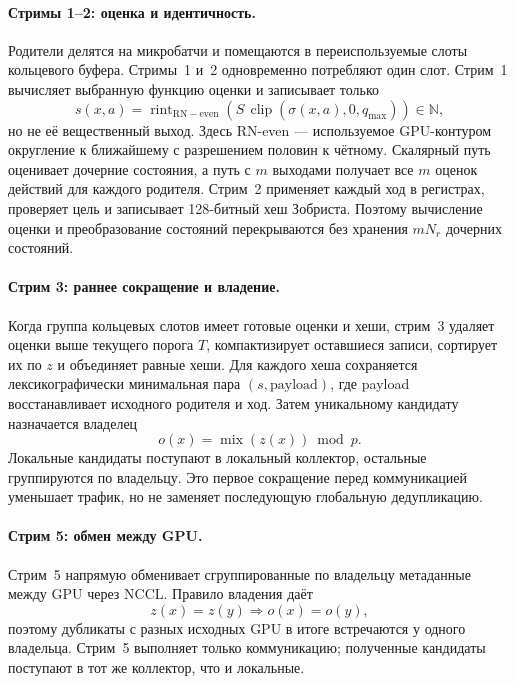 \documentclass[10pt,twocolumn]{article}
\begin{document}
\paragraph{Стримы 1--2: оценка и идентичность.}
Родители делятся на микробатчи и помещаются в переиспользуемые слоты кольцевого
буфера. Стримы~1 и~2 одновременно потребляют один слот. Стрим~1 вычисляет
выбранную функцию оценки и записывает только
\begin{equation}
 s(x,a)=\operatorname{rint}_{\mathrm{RN-even}}
 \left(S\,\operatorname{clip}(\sigma(x,a),0,q_{\max})\right)
 \in\mathbb{N},
 \label{eq:score}
\end{equation}
но не её вещественный выход. Здесь RN-even --- используемое GPU-контуром
округление к ближайшему с разрешением половин к чётному. Скалярный путь оценивает дочерние состояния, а
путь с $m$ выходами получает все $m$ оценок действий для каждого родителя.
Стрим~2 применяет каждый ход в регистрах, проверяет цель и записывает 128-битный
хеш Зобриста. Поэтому вычисление оценки и преобразование состояний перекрываются без
хранения $mN_r$ дочерних состояний.

\paragraph{Стрим 3: раннее сокращение и владение.}
Когда группа кольцевых слотов имеет готовые оценки и хеши, стрим~3 удаляет
оценки выше текущего порога $T$, компактизирует оставшиеся записи, сортирует их
по $z$ и объединяет равные хеши. Для каждого хеша сохраняется лексикографически
минимальная пара $(s,\mathrm{payload})$, где payload восстанавливает исходного
родителя и ход. Затем уникальному кандидату назначается владелец
\begin{equation}
 o(x)=\operatorname{mix}(z(x))\bmod p.
 \label{eq:owner}
\end{equation}
Локальные кандидаты поступают в локальный коллектор, остальные группируются по
владельцу. Это первое сокращение перед коммуникацией уменьшает трафик, но не
заменяет последующую глобальную дедупликацию.

\paragraph{Стрим 5: обмен между GPU.}
Стрим~5 напрямую обменивает сгруппированные по владельцу метаданные между GPU
через NCCL. Правило владения даёт
\begin{equation}
 z(x)=z(y)\Longrightarrow o(x)=o(y),
 \label{eq:owner_invariant}
\end{equation}
поэтому дубликаты с разных исходных GPU в итоге встречаются у одного владельца.
Стрим~5 выполняет только коммуникацию; полученные кандидаты поступают в тот же
коллектор, что и локальные.
\end{document}
